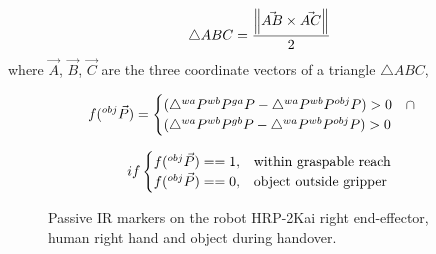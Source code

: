 \begin{equation}\label{area general}
        \triangle{ABC} = \frac{\norm{ \vec{AB} \times \vec{AC} }} {2} \\
\end{equation}
where $\vec{A}$, $\vec{B}$, $\vec{C}$ are the three coordinate vectors of a triangle $\triangle{ABC}$,


\begin{equation}\label{area}
    \centering
    f({}^{obj}\vec{P}) = 
    \begin{cases}
     (\triangle{{}^{wa}P {}^{wb}P {}^{ga}P} - \triangle{{}^{wa}P {}^{wb}P {}^{obj}P}) > 0 \quad \cap \\
     (\triangle{{}^{wa}P {}^{wb}P {}^{gb}P} - \triangle{{}^{wa}P {}^{wb}P {}^{obj}P}) > 0
   \end{cases}         
\end{equation}

\begin{equation}\label{area bool}
    \centering
    if
    \begin{cases}
     f({}^{obj}\vec{P})==1, & \text{within graspable reach}  \\
     f({}^{obj}\vec{P})==0, & \text{object outside gripper}
   \end{cases}         
\end{equation}



\begin{figure}[ht]
	\caption{Passive IR markers on the robot HRP-2Kai right end-effector, human right hand and object during handover.}
	\label{fig:markerEf2}
\end{figure} 

